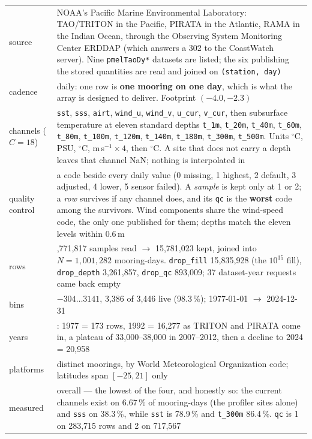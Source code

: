 \documentclass[10pt]{article}
\newcommand{\code}[1]{\texttt{#1}}
\begin{document}
\begin{table}[h]
\centering\setlength{\tabcolsep}{5pt}\footnotesize
\begin{tabular}{@{}>{\raggedright\arraybackslash}p{2.8cm}>{\raggedright\arraybackslash}p{12.5cm}@{}}
\toprule
source & NOAA's Pacific Marine Environmental Laboratory: TAO/TRITON in the Pacific, PIRATA in the Atlantic, RAMA in the Indian Ocean, through the Observing System Monitoring Center ERDDAP (which answers a 302 to the CoastWatch server). Nine \code{pmelTaoDy*} datasets are listed; the six publishing the stored quantities are read and joined on \code{(station, day)} \\
cadence & daily: one row is \textbf{one mooring on one day}, which is what the array is designed to deliver. Footprint $(-4.0, -2.3)$ \\
channels ($C = 18$) & \code{sst}, \code{sss}, \code{airt}, \code{wind\_u}, \code{wind\_v}, \code{u\_cur}, \code{v\_cur}, then subsurface temperature at eleven standard depths \code{t\_1m}, \code{t\_20m}, \code{t\_40m}, \code{t\_60m}, \code{t\_80m}, \code{t\_100m}, \code{t\_120m}, \code{t\_140m}, \code{t\_180m}, \code{t\_300m}, \code{t\_500m}. Units $^\circ$C, PSU, $^\circ$C, m\,s$^{-1}\times 4$, then $^\circ$C. A site that does not carry a depth leaves that channel NaN; nothing is interpolated in \\
quality control & a code beside every daily value (0 missing, 1 highest, 2 default, 3 adjusted, 4 lower, 5 sensor failed). A \emph{sample} is kept only at 1 or 2; a \emph{row} survives if any channel does, and its \code{qc} is the \textbf{worst} code among the survivors. Wind components share the wind-speed code, the only one published for them; depths match the eleven levels within 0.6\,m \\
rows & 35,771,817 samples read $\to$ 15,781,023 kept, joined into $N = 1{,}001{,}282$ mooring-days. \code{drop\_fill} 15,835,928 (the $10^{35}$ fill), \code{drop\_depth} 3,261,857, \code{drop\_qc} 893,009; 37 dataset-year requests came back empty \\
bins & $-304 \ldots 3141$, 3,386 of 3,446 live (98.3\,\%); 1977-01-01 $\to$ 2024-12-31 \\
years & 48: 1977 = 173 rows, 1992 = 16,277 as TRITON and PIRATA come in, a plateau of 33,000--38,000 in 2007--2012, then a decline to 2024 = 20,958 \\
platforms & 159 distinct moorings, by World Meteorological Organization code; latitudes span $[-25, 21]$ only \\
measured & 0.568374 overall --- the lowest of the four, and honestly so: the current channels exist on 6.67\,\% of mooring-days (the profiler sites alone) and \code{sss} on 38.3\,\%, while \code{sst} is 78.9\,\% and \code{t\_300m} 86.4\,\%. \code{qc} is 1 on 283,715 rows and 2 on 717,567 \\

\end{tabular}
\end{table}
\end{document}
